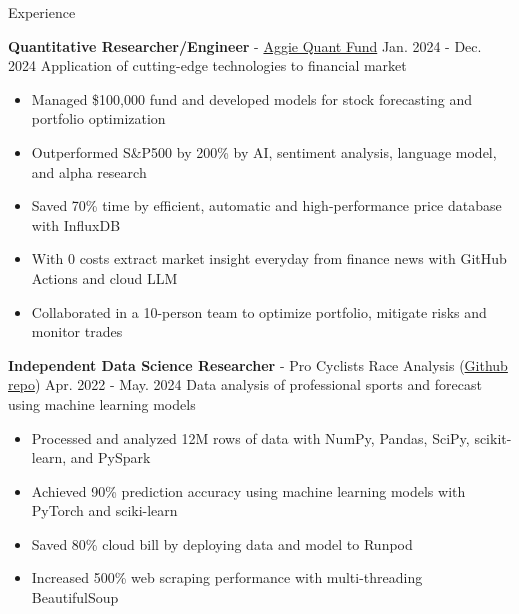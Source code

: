 \documentclass{resume}
\begin{document}
\begin{rSection}{Experience}
    \vspace{0.4em}
    \item \textbf{Quantitative Researcher/Engineer} - \href{https://www.linkedin.com/company/aggieqf}{Aggie Quant Fund} \hfill Jan. 2024 - Dec. 2024
        \newline\hspace*{0.5em} {\normalsize Application of cutting-edge technologies to financial market}
        \begin{itemize}
        \item Managed \$100,000 fund and developed models for stock forecasting and portfolio optimization
        \item Outperformed S\&P500 by 200\% by AI, sentiment analysis, language model, and alpha research
        \item Saved 70\% time by efficient, automatic and high-performance price database with InfluxDB
        \item With 0 costs extract market insight everyday from finance news with GitHub Actions and cloud LLM
        \item Collaborated in a 10-person team to optimize portfolio, mitigate risks and monitor trades
        \end{itemize}

    \vspace{0.4em}
    \item \textbf{Independent Data Science Researcher} - {Pro Cyclists Race Analysis} (\href{https://github.com/noctildon/pro_cyclists}{Github repo}) \hfill Apr. 2022 - May. 2024
        \newline\hspace*{0.5em} {\normalsize Data analysis of professional sports and forecast using machine learning models}
        \begin{itemize}
        \item Processed and analyzed 12M rows of data with NumPy, Pandas, SciPy, scikit-learn, and PySpark
        \item Achieved 90\% prediction accuracy using machine learning models with PyTorch and sciki-learn
        \item Saved 80\% cloud bill by deploying data and model to Runpod
        \item Increased 500\% web scraping performance with multi-threading BeautifulSoup
        \end{itemize}


\end{rSection}
\end{document}
